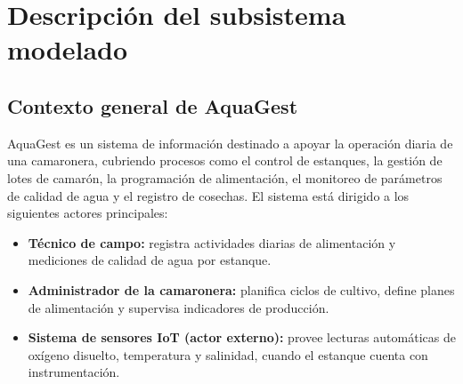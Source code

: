 \documentclass[11pt,a4paper]{article}
\begin{document}
\section{Descripción del subsistema modelado}

\subsection{Contexto general de AquaGest}
AquaGest es un sistema de información destinado a apoyar la operación diaria de una camaronera,
cubriendo procesos como el control de estanques, la gestión de lotes de camarón, la programación de
alimentación, el monitoreo de parámetros de calidad de agua y el registro de cosechas. El sistema está
dirigido a los siguientes actores principales:
\begin{itemize}[nosep]
  \item \textbf{Técnico de campo:} registra actividades diarias de alimentación y mediciones de
        calidad de agua por estanque.
  \item \textbf{Administrador de la camaronera:} planifica ciclos de cultivo, define planes de
        alimentación y supervisa indicadores de producción.
  \item \textbf{Sistema de sensores IoT (actor externo):} provee lecturas automáticas de oxígeno
        disuelto, temperatura y salinidad, cuando el estanque cuenta con instrumentación.
\end{itemize}
\end{document}
